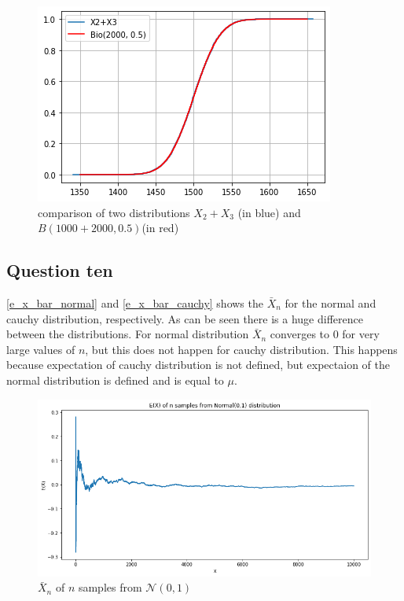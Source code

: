 \documentclass[12pt, a4paper]{book}
\begin{document}
\begin{itemize}
    \begin{figure}[h]
        \centering
        \includegraphics[width=0.6\linewidth]{images/question9/x2x3.png}
        \caption{comparison of two distributions $X_2+X_3$ (in blue) and $B(1000+2000, 0.5)$(in red)}
        \label{x2x3_bionomial}
    \end{figure}

\end{itemize}

\subsection*{Question ten}

\autoref{e_x_bar_normal} and \autoref{e_x_bar_cauchy} shows the $\bar{X}_n$ for the normal and cauchy distribution, respectively.
As can be seen there is a huge difference between the distributions. For normal distribution $\bar{X}_n$ converges to
$0$ for very large values of $n$, but this does not happen for cauchy distribution. This happens because
expectation of cauchy distribution is not defined, but expectaion of the normal distribution is defined and is equal to
$\mu$.

\begin{figure}[h]
    \centering
    \includegraphics[width=0.8\linewidth]{images/question10/normal.png}
    \caption{$\bar{X}_n$ of $n$ samples from $\mathcal{N}(0,1)$}
    \label{e_x_bar_normal}
\end{figure}
\end{document}

